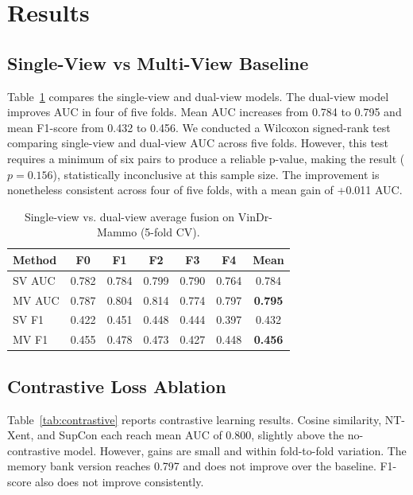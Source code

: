 \documentclass[runningheads]{llncs}
\begin{document}
\section{Results}
\label{sec:results}

\subsection{Single-View vs Multi-View Baseline}

Table~\ref{tab:sv_mv} compares the single-view and dual-view models. The dual-view model improves AUC in four of five folds. Mean AUC increases from 0.784 to 0.795 and mean F1-score from 0.432 to 0.456. We conducted a Wilcoxon signed-rank test comparing single-view and dual-view AUC across five folds. However, this test requires a minimum of six pairs to produce a reliable p-value, making the result ($p=0.156$),  statistically inconclusive at this sample size. The improvement is nonetheless consistent across four of five folds, with a mean gain of +0.011 AUC.

\begin{table}[h]
\caption{Single-view vs. dual-view average fusion on VinDr-Mammo (5-fold CV).}
\label{tab:sv_mv}
\centering
\begin{tabular}{|l|c|c|c|c|c|c|}
\hline
\textbf{Method} & \textbf{F0} & \textbf{F1} & \textbf{F2} & \textbf{F3} & \textbf{F4} & \textbf{Mean} \\
\hline
SV AUC & 0.782 & 0.784 & 0.799 & 0.790 & 0.764 & 0.784 \\
MV AUC & 0.787 & 0.804 & 0.814 & 0.774 & 0.797 & \textbf{0.795} \\
\hline
SV F1  & 0.422 & 0.451 & 0.448 & 0.444 & 0.397 & 0.432 \\
MV F1  & 0.455 & 0.478 & 0.473 & 0.427 & 0.448 & \textbf{0.456} \\
\hline
\end{tabular}
\end{table}

\subsection{Contrastive Loss Ablation}

Table~\ref{tab:contrastive} reports contrastive learning results. Cosine similarity, NT-Xent, and SupCon each reach mean AUC of 0.800, slightly above the no-contrastive model. However, gains are small and within fold-to-fold variation. The memory bank version reaches 0.797 and does not improve over the baseline. F1-score also does not improve consistently.
\end{document}
